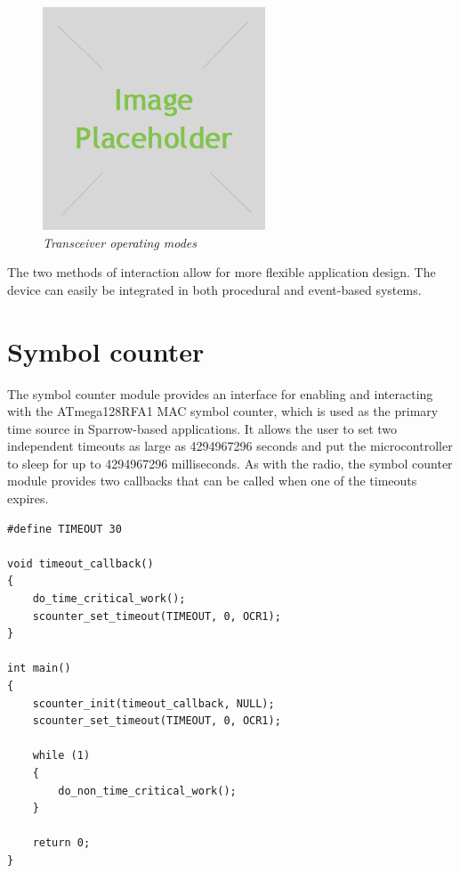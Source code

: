 \begin{figure}[ht]
	\begin{center}
		\includegraphics{img/placeholder.jpg}
	\end{center}
	\caption{\small \itshape{Transceiver operating modes}}
\end{figure}

The two methods of interaction allow for more flexible application design.
The device can easily be integrated in both procedural and event-based systems.

\section{Symbol counter}

The symbol counter module provides an interface for enabling and interacting
with the ATmega128RFA1 MAC symbol counter, which is used as the primary time
source in Sparrow-based applications. It allows the user to set two independent
timeouts as large as 4294967296 seconds and put the microcontroller to sleep
for up to 4294967296 milliseconds. As with the radio, the symbol counter module
provides two callbacks that can be called when one of the timeouts expires.

\lstset{
	language=C, numbers=none, caption=Time critical action snippet,
	label=lst:scounter_snippet
}
\begin{lstlisting}
#define TIMEOUT	30

void timeout_callback()
{
	do_time_critical_work();
	scounter_set_timeout(TIMEOUT, 0, OCR1);
}

int main()
{
	scounter_init(timeout_callback, NULL);
	scounter_set_timeout(TIMEOUT, 0, OCR1);

	while (1)
	{
		do_non_time_critical_work();
	}

	return 0;
}
\end{lstlisting}

